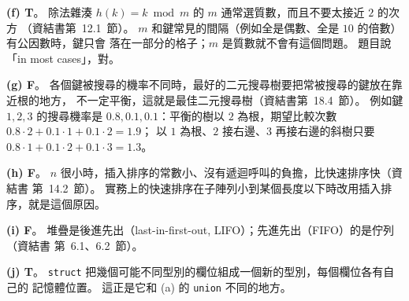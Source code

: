 \begin{pastsoln}
\textbf{(f) T}。 除法雜湊 $h(k) = k \bmod m$ 的 $m$ 通常選質數，而且不要太接近 $2$ 的次方
（資結書第~12.1~節）。 $m$ 和鍵常見的間隔（例如全是偶數、全是 $10$ 的倍數）有公因數時，鍵只會
落在一部分的格子；$m$ 是質數就不會有這個問題。 題目說「in most cases」，對。

\textbf{(g) F}。 各個鍵被搜尋的機率不同時，最好的二元搜尋樹要把常被搜尋的鍵放在靠近根的地方，
不一定平衡，這就是最佳二元搜尋樹（資結書第~18.4~節）。 例如鍵 $1, 2, 3$ 的搜尋機率是
$0.8, 0.1, 0.1$：平衡的樹以 $2$ 為根，期望比較次數 $0.8 \cdot 2 + 0.1 \cdot 1 + 0.1 \cdot 2 = 1.9$；
以 $1$ 為根、$2$ 接右邊、$3$ 再接右邊的斜樹只要 $0.8 \cdot 1 + 0.1 \cdot 2 + 0.1 \cdot 3 = 1.3$。

\textbf{(h) F}。 $n$ 很小時，插入排序的常數小、沒有遞迴呼叫的負擔，比快速排序快（資結書
第~14.2~節）。 實務上的快速排序在子陣列小到某個長度以下時改用插入排序，就是這個原因。

\textbf{(i) F}。 堆疊是後進先出（last-in-first-out, LIFO）；先進先出（FIFO）的是佇列（資結書
第~6.1、6.2~節）。

\textbf{(j) T}。 \texttt{struct} 把幾個可能不同型別的欄位組成一個新的型別，每個欄位各有自己的
記憶體位置。 這正是它和 (a) 的 \texttt{union} 不同的地方。
\end{pastsoln}
